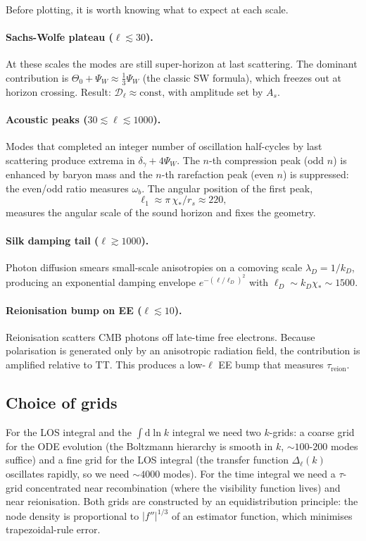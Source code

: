 Before plotting, it is worth knowing what to expect at each scale.

\paragraph{Sachs-Wolfe plateau ($\ell \lesssim 30$).}
At these scales the modes are still super-horizon at last scattering. The dominant contribution is $\Theta_0 + \Psi_W \approx \tfrac{1}{3}\Psi_W$ (the classic SW formula), which freezes out at horizon crossing. Result: $\mathcal{D}_\ell \approx \mathrm{const}$, with amplitude set by $A_s$.

\paragraph{Acoustic peaks ($30 \lesssim \ell \lesssim 1000$).}
Modes that completed an integer number of oscillation half-cycles by last scattering produce extrema in $\delta_\gamma + 4\Psi_W$. The $n$-th compression peak (odd $n$) is enhanced by baryon mass and the $n$-th rarefaction peak (even $n$) is suppressed: the even/odd ratio measures $\omega_b$. The angular position of the first peak,
\[
  \ell_1 \approx \pi\,\chi_*/r_s \approx 220,
\]
measures the angular scale of the sound horizon and fixes the geometry.

\paragraph{Silk damping tail ($\ell \gtrsim 1000$).}
Photon diffusion smears small-scale anisotropies on a comoving scale $\lambda_D = 1/k_D$, producing an exponential damping envelope $e^{-(\ell/\ell_D)^2}$ with $\ell_D \sim k_D \chi_* \sim 1500$.

\paragraph{Reionisation bump on EE ($\ell \lesssim 10$).}
Reionisation scatters CMB photons off late-time free electrons. Because polarisation is generated only by an anisotropic radiation field, the contribution is amplified relative to TT. This produces a low-$\ell$ EE bump that measures $\tau_\mathrm{reion}$.

\subsection{Choice of grids}

For the LOS integral and the $\int \mathrm{d}\ln k$ integral we need two $k$-grids: a coarse grid for the ODE evolution (the Boltzmann hierarchy is smooth in $k$, $\sim 100$-$200$ modes suffice) and a fine grid for the LOS integral (the transfer function $\Delta_\ell(k)$ oscillates rapidly, so we need $\sim 4000$ modes). For the time integral we need a $\tau$-grid concentrated near recombination (where the visibility function lives) and near reionisation. Both grids are constructed by an equidistribution principle: the node density is proportional to $|f''|^{1/3}$ of an estimator function, which minimises trapezoidal-rule error.

